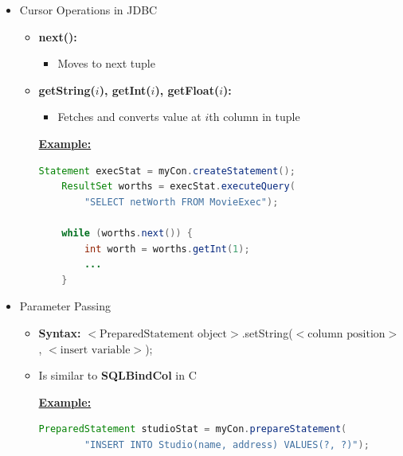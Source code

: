 \documentclass[12pt]{article}
\begin{document}
\begin{enumerate}[1.]
\begin{enumerate}[a)]
\begin{itemize}
\begin{itemize}
\begin{enumerate}[1.]
                \end{enumerate}
                \item Cursor Operations in JDBC
                \begin{itemize}
                    \item \textbf{next():}
                    \begin{itemize}
                        \item Moves to next tuple
                    \end{itemize}
                    \item \textbf{getString($i$), getInt($i$), getFloat($i$):}
                    \begin{itemize}
                        \item Fetches and converts value at $i$th column in tuple
                    \end{itemize}

                    \bigskip

                    \underline{\textbf{Example:}}

                    \bigskip

    \begin{lstlisting}[language=JAVA]
    Statement execStat = myCon.createStatement();
    ResultSet worths = execStat.executeQuery(
        "SELECT netWorth FROM MovieExec");

    while (worths.next()) {
        int worth = worths.getInt(1);
        ...
    }
    \end{lstlisting}

                \end{itemize}
                \item Parameter Passing
                \begin{itemize}
                    \item \textbf{Syntax:} $<\text{PreparedStatement object}>$.setString($<\text{column position}>$, $<\text{insert variable}>$);
                    \item Is similar to \textbf{SQLBindCol} in C

                    \bigskip

                    \underline{\textbf{Example:}}

                    \bigskip

    \begin{lstlisting}[language=JAVA]
    PreparedStatement studioStat = myCon.prepareStatement(
        "INSERT INTO Studio(name, address) VALUES(?, ?)");


\end{lstlisting}
\end{itemize}
\end{itemize}
\end{itemize}
\end{enumerate}
\end{enumerate}
\end{document}
